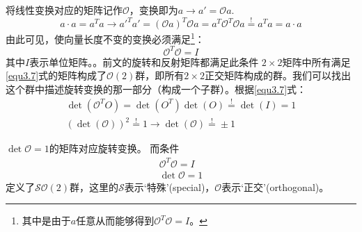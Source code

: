 将线性变换对应的矩阵记作$\mathcal{O}$，变换即为$a \rightarrow a' = \mathcal{O}a$.
\begin{equation}
\label{equ3.6}
a \cdot a = a^{{T}} a \rightarrow a'^{{T}} a' = (\mathcal{O} a)^{{T}} \mathcal{O} a = a^{{T}} \mathcal{O}^{{T}} \mathcal{O} a \stackrel{!}{=} a^{{T}} a = a \cdot a
\end{equation}
由此可见，使向量长度不变的变换必须满足\footnote{其中是由于$a$任意从而能够得到$\mathcal{O}^{{T}} \mathcal{O} = I$。}：
\begin{equation}
\label{equ3.7}
\mathcal{O}^{{T}} \mathcal{O} = I
\end{equation}
其中$I$表示单位矩阵。\mpar{ \[I =
	\begin{pmatrix}
		1 & 0 \\ 0 & 1
	\end{pmatrix}\]}。前文的旋转和反射矩阵都满足此条件%
$2 \times 2$矩阵中所有满足\eqref{equ3.7}式的矩阵构成了$\mathcal{O}(2)$群，即所有$2 \times 2$正交矩阵构成的群。我们可以找出这个群中描述旋转变换的那一部分（构成一个子群）。根据\eqref{equ3.7}式：
\begin{align}
\det(\mathcal{O}^{{T}} O ) = \det(O^{{T}}) \det(O) \stackrel{!}{=} \det(I) = 1 \nonumber\\
\label{equ3.8}
(\det(\mathcal{O}))^2 \stackrel{!}{=} 1 \rightarrow \det{(\mathcal{O})} \stackrel{!}{=} \pm 1
\end{align}

$\det \mathcal{O} = 1$的矩阵对应旋转变换。
而条件
\begin{align}
\label{equ3.9}
\mathcal{O}^{{T}} \mathcal{O} = I \\
\label{equ3.10}
\det \mathcal{O} = 1
\end{align}
定义了$\mathcal{SO}(2)$群，这里的$\mathcal{S}$表示‘特殊’(special)，$\mathcal{O}$表示‘正交’(orthogonal)。


